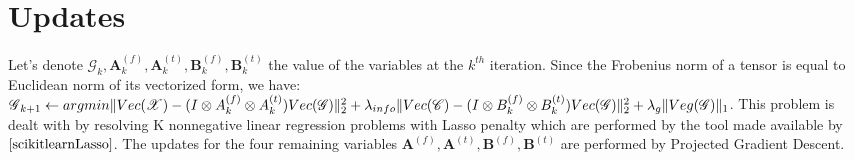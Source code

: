 \documentclass{article}
\def\tX{\boldsymbol{{\mathscr X}}}
\def\tG{\boldsymbol{{\mathscr G}}}
\def\tC{\boldsymbol{{\mathscr C}}}
\def\A{{\mathbf A}}
\def\B{{\mathbf B}}
\begin{document}
\section{Updates}
Let's denote $\tG_{k},\A^{(f)}_{k},\A^{(t)}_{k},\B^{(f)}_{k},\B^{(t)}_{k}$ the value of the variables at the $k^{th}$ iteration. Since the Frobenius norm of a tensor is equal to Euclidean norm of its vectorized form, we have:\\
$\tG_{k+1}\leftarrow argmin\|Vec(\tX)-(I\otimes A^{(f)}_{k}\otimes A^{(t)}_{k})Vec(\tG)\|^{2}_{2}+\\ \lambda_{info}\|Vec(\tC)-(I\otimes B^{(f)}_{k}\otimes B^{(t)}_{k})Vec(\tG)\|^{2}_{2}+\lambda_{g}\|Veg(\tG)\|_{1}$. This problem is dealt with by resolving K nonnegative linear regression problems with Lasso penalty which are performed by the tool made available by $\cite{scikitlearnLasso}$. The updates for the four remaining variables $\A^{(f)},\A^{(t)},\B^{(f)},\B^{(t)}$ are performed by Projected Gradient Descent.  
\newpage


 
\end{document}
